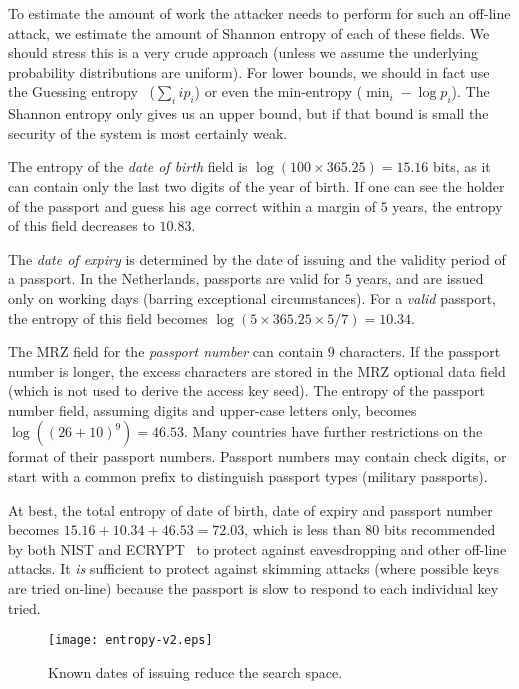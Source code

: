 \documentclass[runningheads,envcountsame,envcountsect,oribibl]{llncs}
\begin{document}
To estimate the amount of work the attacker needs to perform for
such an off-line attack, we estimate
the amount of Shannon entropy of each of these fields. We should stress this is
a very crude approach (unless we assume the underlying probability
distributions are uniform). For lower bounds, we should in fact use the
Guessing entropy~\cite{massey1994guessingentropy} ($\sum_i i p_i$) or even the
min-entropy ($\min_i - \log p_i$). The Shannon
entropy only gives us an upper bound, but if that bound is small
the security of the system is most certainly weak.

 
The entropy of the
\emph{date of birth} field is $\log ( 100 \times 365.25) = 15.16$ bits,
as it can contain only the last two digits of the year of birth.
If one can see the holder of the passport and guess his age correct within a
margin of $5$ years, the entropy of this field decreases to $10.83$.

The \emph{date of expiry} is determined by the date of issuing and the validity
period of a passport. In the Netherlands, passports are valid for $5$ years,
and are issued only on working days (barring exceptional circumstances).
For a \emph{valid} passport, the entropy of this field becomes
$\log ( 5 \times 365.25 \times 5/7 ) = 10.34$.

The MRZ field for the \emph{passport number} can contain $9$ characters. If the
passport number is longer, the excess characters are stored in the MRZ optional
data field (which is not used to derive the access key seed).
The entropy of the passport number
field, assuming digits and upper-case letters only, becomes
$\log((26+10)^9)=46.53$.  Many countries have further restrictions on the
format of their passport numbers. Passport numbers may contain check digits, or
start with a common prefix to distinguish passport types (\eg military
passports).

At best, the total entropy of date of birth, date of expiry and passport number
becomes $15.16 + 10.34 +46.53 = 72.03$, which is less than $80$ bits
recommended by both NIST and ECRYPT~\cite{ecrypt-keylength,nist-keys}
to protect against eavesdropping and other off-line attacks.
It \emph{is} sufficient to protect against
skimming attacks (where possible keys are tried on-line) because the passport 
is slow to respond to each individual key tried.

\begin{figure}[t]
\begin{center}
\texttt{[image: entropy-v2.eps]}
\end{center}
\caption{Known dates of issuing reduce the search space.}
\label{fig-entropy}
\end{figure}
\end{document}
